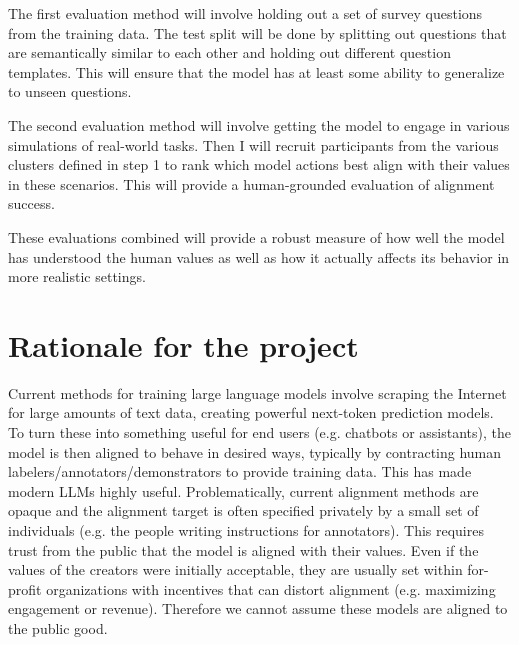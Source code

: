 The first evaluation method will involve holding out a set of survey questions from the training data. The test split will be done by splitting out questions that are semantically similar to each other and holding out different question templates. This will ensure that the model has at least some ability to generalize to unseen questions.

The second evaluation method will involve getting the model to engage in various simulations of real-world tasks. Then I will recruit participants from the various clusters defined in step 1 to rank which model actions best align with their values in these scenarios. This will provide a human-grounded evaluation of alignment success.

These evaluations combined will provide a robust measure of how well the model has understood the human values as well as how it actually affects its behavior in more realistic settings.

\section{Rationale for the project}

Current methods for training large language models involve scraping the Internet for large amounts of text data, creating powerful next-token prediction models. To turn these into something useful for end users (e.g. chatbots or assistants), the model is then aligned to behave in desired ways, typically by contracting human labelers/annotators/demonstrators to provide training data. This has made modern LLMs highly useful.
Problematically, current alignment methods are opaque and the alignment target is often specified privately by a small set of individuals (e.g. the people writing instructions for annotators). This requires trust from the public that the model is aligned with their values. Even if the values of the creators were initially acceptable, they are usually set within for-profit organizations with incentives that can distort alignment (e.g. maximizing engagement or revenue). Therefore we cannot assume these models are aligned to the public good.

